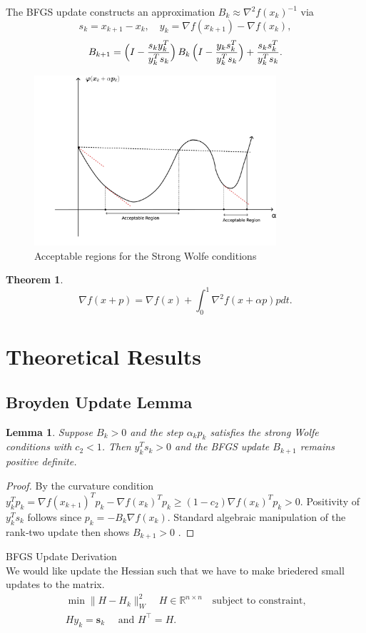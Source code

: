 \documentclass[12pt]{report}
\newtheorem{lemma}{Lemma}[section]
\newtheorem{theorem}{Theorem}
\begin{document}
The BFGS update constructs an approximation $B_k \approx \nabla^2 f(x_k)^{-1}$ via
\[
	s_k = x_{k+1}-x_k,\quad y_k=\nabla f(x_{k+1})-\nabla f(x_k),
\]
\[
	B_{k+1} = \Bigl(I - \frac{s_k y_k^T}{y_k^T s_k}\Bigr)\,B_k\,
	\Bigl(I - \frac{y_k s_k^T}{y_k^T s_k}\Bigr) + \frac{s_k s_k^T}{y_k^T s_k}.
\]

\begin{figure}[htpb]
	\centering
	\includegraphics[width=0.8\textwidth]{./drawing.png}
	\caption{Acceptable regions for the Strong Wolfe conditions}
	\label{fig:}
\end{figure}
\begin{theorem}
	\[
		\nabla f(x +p) = \nabla f(x) + \int_0^1 \nabla^2 f(x+\alpha p) p dt
		.\]
\end{theorem}
\section{Theoretical Results}
\subsection{Broyden Update Lemma}
\begin{lemma}
	Suppose $B_k\!>\!0$ and the step $\alpha_k p_k$ satisfies the strong Wolfe conditions with $c_2<1$.  Then $y_k^Ts_k>0$ and the BFGS update $B_{k+1}$ remains positive definite.
\end{lemma}
\begin{proof}
	By the curvature condition $y_k^T p_k = \nabla f(x_{k+1})^T p_k - \nabla f(x_k)^T p_k \ge (1-c_2)\nabla f(x_k)^T p_k>0$.  Positivity of $y_k^Ts_k$ follows since $p_k=-B_k\nabla f(x_k)$.  Standard algebraic manipulation of the rank‐two update then shows $B_{k+1}>0$ .
\end{proof}
BFGS Update Derivation\\
We would like update the Hessian such that we have to make briedered small updates to the matrix.\\
\begin{gather*}
	\min \| H-H_{k}\|_W^{2}\quad  H \in \mathbb{R}^{n \times n} \quad \text{subject to constraint,} \\
	H y_{k}=\bm{s}_k \quad \text { and } H^{\top}=H
	.\end{gather*}
\end{document}
